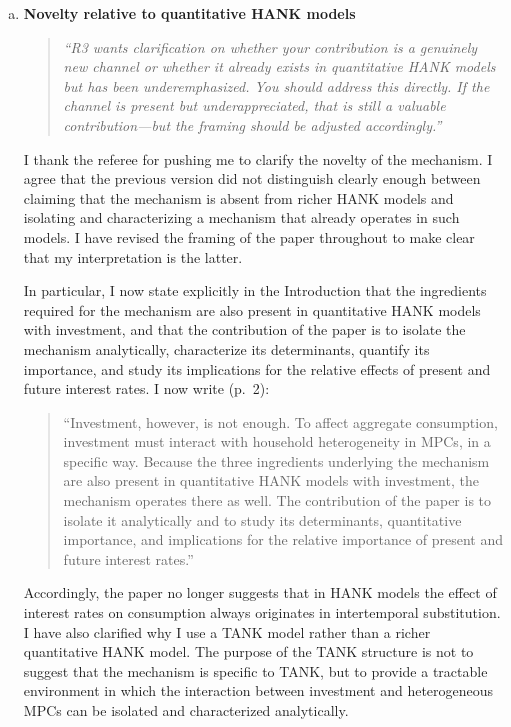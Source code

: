 \documentclass[11pt]{article}
\begin{document}
\begin{enumerate}[a)]
The appendix derives the resulting investment function conditional on the path of internal funds. Its main result is that the qualitative result emphasized in the paper survives in this environment: future interest rates remain discounted relative to current ones. In particular, from one period ahead onward their weights decline geometrically at a rate $\lambda_B$, with
$\lambda_B<\beta(1-\delta)<1.$

\item  \textbf{Novelty relative to quantitative HANK models}

\begin{quote}
\itshape ``R3 wants clarification on whether your contribution is a genuinely new channel or whether it already exists in quantitative HANK models but has been underemphasized. You should address this directly. If the channel is present but underappreciated, that is still a valuable contribution---but the framing should be adjusted accordingly.''
\end{quote}

I thank the referee for pushing me to clarify the novelty of the mechanism. I agree that the previous version did not distinguish clearly enough between claiming that the mechanism is absent from richer HANK models and isolating and characterizing a mechanism that already operates in such models. I have revised the framing of the paper throughout to make clear that my interpretation is the latter.

In particular, I now state explicitly in the Introduction that the ingredients required for the mechanism are also present in quantitative HANK models with investment, and that the contribution of the paper is to isolate the mechanism analytically, characterize its determinants, quantify its importance, and study its implications for the relative effects of present and future interest rates. I now write (p.~2):

\begin{quote}
``Investment, however, is not enough. To affect aggregate consumption, investment must interact with household heterogeneity in MPCs, in a specific way. Because the three ingredients underlying the mechanism are also present in quantitative HANK models with investment, the mechanism operates there as well. The contribution of the paper is to isolate it analytically and to study its determinants, quantitative importance, and implications for the relative importance of present and future interest rates.''
\end{quote}

Accordingly, the paper no longer suggests that in HANK models the effect of interest rates on consumption always originates in intertemporal substitution. I have also clarified why I use a TANK model rather than a richer quantitative HANK model. The purpose of the TANK structure is not to suggest that the mechanism is specific to TANK, but to provide a tractable environment in which the interaction between investment and heterogeneous MPCs can be isolated and characterized analytically.

\end{enumerate}
\end{document}
